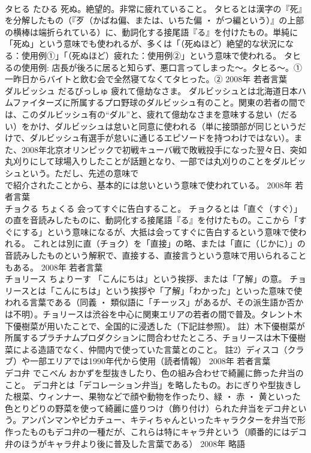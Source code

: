 \documentclass[8pt]{extreport}
\begin{document}
\begin{CJK}{UTF8}{min}
\\	タヒる	たひる	死ぬ。絶望的。非常に疲れていること。	タヒるとは漢字の『死』を分解したもの（『歹（かばね偏、または、いちた偏 ・ がつ編という）』の上部の横棒は端折られている）に、動詞化する接尾語『る』を付けたもの。単純に「死ぬ」という意味でも使われるが、多くは「（死ぬほど）絶望的な状況になる：使用例①」「（死ぬほど）疲れた：使用例②」という意味で使われる。 タヒるの使用例: 店長が後ろに居ると知らず、悪口言ってしまった～。タヒる～。① 一昨日からバイトと飲む会で全然寝てなくてタヒった。②	2008年	若者言葉	
\\	ダルビッシュ	だるびっしゅ	疲れて億劫なさま。	ダルビッシュとは北海道日本ハムファイターズに所属するプロ野球のダルビッシュ有のこと。関東の若者の間では、このダルビッシュ有の“ダル”と、疲れて億劫なさまを意味する怠い（だるい）をかけ、ダルビッシュは怠いと同意に使われる（単に接頭部が同じというだけで、ダルビッシュ有選手が怠いに通じるエピソードを持つわけではない）。また、2008年北京オリンピックで初戦キューバ戦で敗戦投手になった翌々日、突如丸刈りにして球場入りしたことが話題となり、一部では丸刈りのことをダルビッシュという。ただし、先述の意味で
\\	で紹介されたことから、基本的には怠いという意味で使われている。	2008年	若者言葉	
\\	チョクる	ちょくる	会ってすぐに告白すること。	チョクるとは「直ぐ（すぐ）」の直を音読みしたものに、動詞化する接尾語『る』を付けたもの。ここから「すぐにする」という意味になるが、大抵は会ってすぐに告白するという意味で使われる。 これとは別に直（チョク）を「直接」の略、または「直に（じかに）」の音読みしたものという解釈で、直接する、直接言うという意味で用いられることもある。	2008年	若者言葉	
\\	チョリース	ちょりーす	「こんにちは」という挨拶、または「了解」の意。	チョリースとは「こんにちは」という挨拶や「了解」「わかった」といった意味で使われる言葉である（同義 ・ 類似語に「チーッス」があるが、その派生語か否かは不明）。チョリースは渋谷を中心に関東エリアの若者の間で普及。タレント木下優樹菜が用いたことで、全国的に浸透した（下記註参照）。 註）木下優樹菜が所属するプラチナムプロダクションに問合わせたところ、チョリースは木下優樹菜による造語でなく、仲間内で使っていた言葉とのこと。 註2）ディスコ（クラブ）や一部エリアでは1990年代から使用（読者情報）	2008年	若者言葉	
\\	デコ弁	でこべん	おかずを型抜きしたり、色の組み合わせで綺麗に飾った弁当のこと。	デコ弁とは「デコレーション弁当」を略したもの。おにぎりや型抜きした根菜、ウィンナー、果物などで顔や動物を作ったり、緑 ・ 赤 ・ 黄といった色とりどりの野菜を使って綺麗に盛りつけ（飾り付け）られた弁当をデコ弁という。アンパンマンやピカチュー、キティちゃんといったキャラクターを弁当で形作ったものもデコ弁の一種だが、これらは特にキャラ弁という（順番的にはデコ弁のほうがキャラ弁より後に普及した言葉である）	2008年	略語	

\end{CJK}
\end{document}
